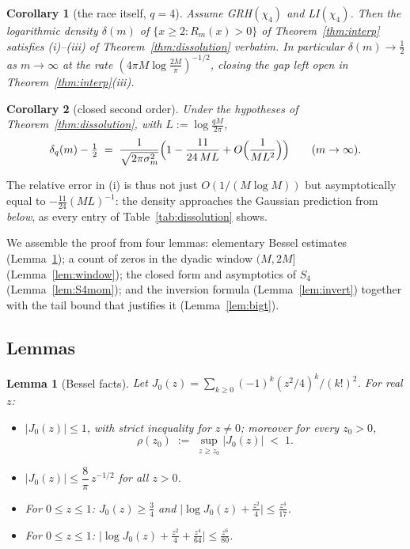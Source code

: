 \documentclass[11pt]{article}
\newtheorem{lemma}{Lemma}
\newtheorem{corollary}{Corollary}
\begin{document}
\begin{corollary}[the race itself, $q=4$]\label{cor:dissolution-race}
Assume GRH$(\chi_4)$ and LI$(\chi_4)$. Then the logarithmic density
$\delta(m)$ of $\{x\ge2:R_m(x)>0\}$ of Theorem~\ref{thm:interp}
satisfies (i)--(iii) of Theorem~\ref{thm:dissolution} verbatim. In
particular $\delta(m)\to\tfrac12$ as $m\to\infty$ at the rate
$(4\pi M\log\tfrac{2M}{\pi})^{-1/2}$, closing the gap left open in
Theorem~\ref{thm:interp}(iii).
\end{corollary}

\begin{corollary}[closed second order]\label{cor:secondorder}
Under the hypotheses of Theorem~\ref{thm:dissolution}, with
$L:=\log\tfrac{qM}{2\pi}$,
\[
\delta_q(m)-\tfrac12\;=\;\frac{1}{\sqrt{2\pi\sigma_m^2}}
\Bigl(1-\frac{11}{24\,ML}+O\Bigl(\frac{1}{ML^2}\Bigr)\Bigr)
\qquad(m\to\infty).
\]
\end{corollary}

The relative error in (i) is thus not just $O(1/(M\log M))$ but
asymptotically equal to $-\tfrac{11}{24}(ML)^{-1}$: the density
approaches the Gaussian prediction from \emph{below}, as every entry
of Table~\ref{tab:dissolution} shows.

We assemble the proof from four lemmas: elementary Bessel estimates
(Lemma~\ref{lem:J0facts}); a count of zeros in the dyadic window
$(M,2M]$ (Lemma~\ref{lem:window}); the closed form and asymptotics of
$S_4$ (Lemma~\ref{lem:S4mom}); and the inversion formula
(Lemma~\ref{lem:invert}) together with the tail bound that justifies
it (Lemma~\ref{lem:bigt}).

\subsection*{Lemmas}

\begin{lemma}[Bessel facts]\label{lem:J0facts}
Let $J_0(z)=\sum_{k\ge0}(-1)^k(z^2/4)^k/(k!)^2$. For real $z$:
\begin{itemize}
\item[(J1)] $|J_0(z)|\le1$, with strict inequality for $z\ne0$;
moreover for every $z_0>0$,
\[
\rho(z_0)\;:=\;\sup_{z\ge z_0}|J_0(z)|\;<\;1 .
\]
\item[(J2)] $|J_0(z)|\le\dfrac{8}{\pi}\,z^{-1/2}$ for all $z>0$.
\item[(J3)] For $0\le z\le1$: $J_0(z)\ge\tfrac34$ and
$\bigl|\log J_0(z)+\tfrac{z^2}4\bigr|\le\tfrac{z^4}{17}$.
\item[(J4)] For $0\le z\le1$:
$\bigl|\log J_0(z)+\tfrac{z^2}4+\tfrac{z^4}{64}\bigr|
\le\tfrac{z^6}{80}$.
\end{itemize}
\end{lemma}
\end{document}

